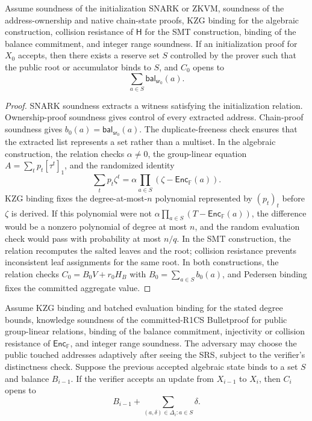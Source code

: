 \documentclass[runningheads]{llncs}
\newcommand{\F}{\mathbb{F}}
\newcommand{\Enc}{\mathsf{Enc}}
\newcommand{\CRH}{\mathsf{H}}
\newcommand{\bal}{\mathsf{bal}}
\newcommand{\sr}{\mathsf{sr}}
\newcommand{\dlist}{\Delta}
\begin{document}
\begin{theorem}
Assume soundness of the initialization SNARK or ZKVM, soundness of the address-ownership and native chain-state proofs, KZG binding for the algebraic construction, collision resistance of \(\CRH\) for the SMT construction, binding of the balance commitment, and integer range soundness.  If an initialization proof for \(X_0\) accepts, then there exists a reserve set \(S\) controlled by the prover such that the public root or accumulator binds to \(S\), and \(C_0\) opens to
\[
        \sum_{a\in S}\bal_{\sr_0}(a).
\]
\end{theorem}

\begin{proof}
SNARK soundness extracts a witness satisfying the initialization relation.  Ownership-proof soundness gives control of every extracted address.  Chain-proof soundness gives \(b_0(a)=\bal_{\sr_0}(a)\).  The duplicate-freeness check ensures that the extracted list represents a set rather than a multiset.  In the algebraic construction, the relation checks \(\alpha\ne0\), the group-linear equation \(A=\sum_t p_t[\tau^t]_1\), and the randomized identity
\[
        \sum_t p_t\zeta^t=\alpha\prod_{a\in S}(\zeta-\Enc_\F(a)).
\]
KZG binding fixes the degree-at-most-\(n\) polynomial represented by \((p_t)_t\) before \(\zeta\) is derived.  If this polynomial were not \(\alpha\prod_{a\in S}(T-\Enc_\F(a))\), the difference would be a nonzero polynomial of degree at most \(n\), and the random evaluation check would pass with probability at most \(n/q\).  In the SMT construction, the relation recomputes the salted leaves and the root; collision resistance prevents inconsistent leaf assignments for the same root.  In both constructions, the relation checks \(C_0=B_0V+r_0H_B\) with \(B_0=\sum_{a\in S}b_0(a)\), and Pedersen binding fixes the committed aggregate value.
\end{proof}

\begin{theorem}\label{thm:alg-update-sound}
Assume KZG binding and batched evaluation binding for the stated degree bounds, knowledge soundness of the committed-R1CS Bulletproof for public group-linear relations, binding of the balance commitment, injectivity or collision resistance of \(\Enc_\F\), and integer range soundness.  The adversary may choose the public touched addresses adaptively after seeing the SRS, subject to the verifier's distinctness check.  Suppose the previous accepted algebraic state binds to a set \(S\) and balance \(B_{i-1}\).  If the verifier accepts an update from \(X_{i-1}\) to \(X_i\), then \(C_i\) opens to
\[
        B_{i-1}+\sum_{(a,\delta)\in\dlist_i:a\in S}\delta .
\]
\end{theorem}
\end{document}
